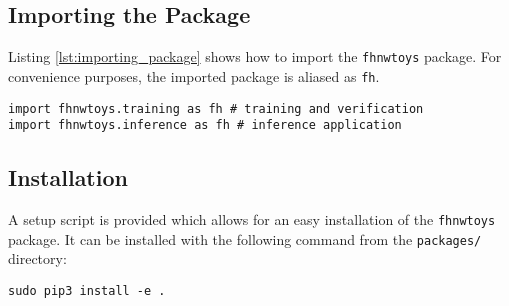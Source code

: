\subsection{Importing the Package}
\label{subsec:inference:package:importing_the_package}
Listing \ref{lst:importing_package} shows how to import the \texttt{fhnwtoys} package.
For convenience purposes, the imported package is aliased as \texttt{fh}.

\begin{lstlisting}[style=python, caption={Importing the \texttt{fhnwtoys} Python package}, label=lst:importing_package]
import fhnwtoys.training as fh # training and verification
import fhnwtoys.inference as fh # inference application
\end{lstlisting}

\subsection{Installation}
\label{subsec:inference:package:installation}
A setup script is provided which allows for an easy installation of the \texttt{fhnwtoys} package.
It can be installed with the following command from the \texttt{packages/} directory:

\begin{lstlisting}[style=bash]
sudo pip3 install -e .
\end{lstlisting}

